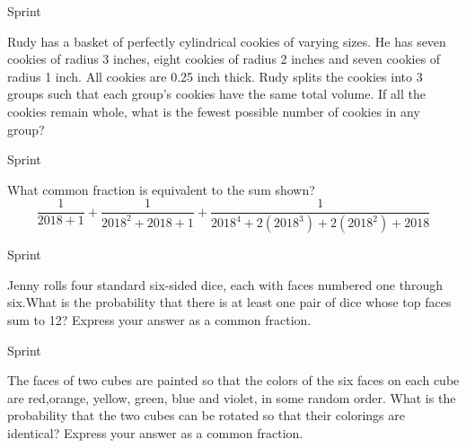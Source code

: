 \documentclass[9pt]{beamer}
\begin{document}
\begin{frame}[t]{Sprint \insertframenumber}
\begin{block}{}
    Rudy has a basket of perfectly cylindrical cookies of varying sizes. He has seven cookies of radius 3 inches, eight cookies of radius 2 inches and seven cookies of radius 1 inch. All cookies are 0.25 inch thick. Rudy splits the cookies into 3 groups such that each group's cookies have the same total volume. If all the cookies remain whole, what is the fewest possible number of cookies in any group?
    
\end{block}
\end{frame}

\begin{frame}[t]{Sprint \insertframenumber}
\begin{block}{}
    What common fraction is equivalent to the sum shown?
    \[ \frac{1}{2018+1} + \frac{1}{2018^2+2018+1} + \frac{1}{2018^4+2(2018^3)+2(2018^2)+2018} \]
    
\end{block}
\end{frame}

\begin{frame}[t]{Sprint \insertframenumber}
\begin{block}{}
    Jenny rolls four standard six-sided dice, each with faces numbered one through six.What is the probability that there is at least one pair of dice whose top faces sum to 12? Express your answer as a common fraction.
    
\end{block}
\end{frame}

\begin{frame}[t]{Sprint \insertframenumber}
\begin{block}{}
    The faces of two cubes are painted so that the colors of the six faces on each cube are red,orange, yellow, green, blue and violet, in some random order. What is the probability that the two cubes can be rotated so that their colorings are identical? Express your answer as a common fraction.
    
\end{block}
\end{frame}
\end{document}
